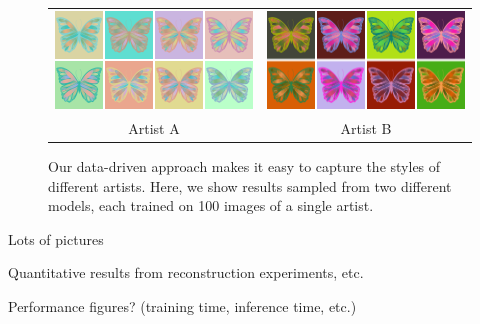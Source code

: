 \begin{figure}[ht]
\begin{tabular}{cc} 
\includegraphics[width=.475\linewidth]{figs/styleSugar}&\includegraphics[width=.475\linewidth]{figs/styleAlbenaj}\\
Artist A&Artist B\\
\end{tabular}

\caption{Our data-driven approach makes it easy to capture the styles of different artists. Here, we show results sampled from two different models, each trained on 100 images of a single artist.}
\vspace{-1.0em}
\end{figure}

Lots of pictures

Quantitative results from reconstruction experiments, etc.

Performance figures? (training time, inference time, etc.)